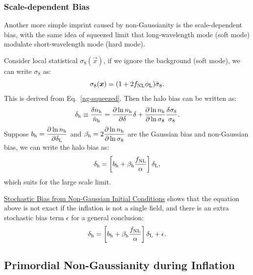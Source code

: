 \subsubsection{Scale-dependent Bias}
Another more simple imprint caused by non-Gaussianity is the scale-dependent bias, with the same idea of squeezed limit that long-wavelength mode (soft mode) modulate short-wavelength mode (hard mode). 

Consider local statistical $\sigma_8(\vec{x})$, if we ignore the background (soft mode), we can write $\sigma_8$ as:
\begin{equation}
    \sigma_8(\vec{x}) = (1+2f_{\rm NL}\phi_{\rm L})\bar{\sigma}_8.
\end{equation}
This is derived from Eq.~\ref{ng-squeezed}. Then the halo bias can be written as:
\begin{equation}
    \delta_{\rm h} \equiv \frac{\delta n_{\rm h}}{\bar{n}_{\rm h}} = \frac{\partial \ln n_{\rm h}}{\partial \delta} \delta + \frac{\partial \ln n_{\rm h}}{\partial \ln \sigma_8} \frac{\delta \sigma_8}{\sigma_8}.
\end{equation}
Suppose $b_{\rm h} = \dfrac{\pp \ln n_{\rm h}}{\pp \delta_{\rm L}}$ and $\beta_{\rm h} = 2\dfrac{\pp \ln n_{\rm h}}{\pp \ln \sigma_8}$ are the Gaussian bias and non-Gaussian bias, we can write the halo bias as:
\begin{equation}
    \delta_{\rm h} = \left[b_{\rm h}+\beta_{\rm h}\dfrac{f_{\rm NL}}{\alpha}\right] \delta_{\rm L},
\end{equation}
which suits for the large scale limit.

\href{https://arxiv.org/pdf/1209.2173}{Stochastic Bias from Non-Gaussian Initial Conditions} shows that the equation above is not exact if the inflation is not a single field, and there is an extra stochastic bias term $\epsilon$ for a general conclusion:
\begin{equation}
    \delta_{\rm h} = \left[b_{\rm h}+\beta_{\rm h}\dfrac{f_{\rm NL}}{\alpha}\right] \delta_{\rm L} + \epsilon.
\end{equation}



\subsection{Primordial Non-Gaussianity during Inflation}